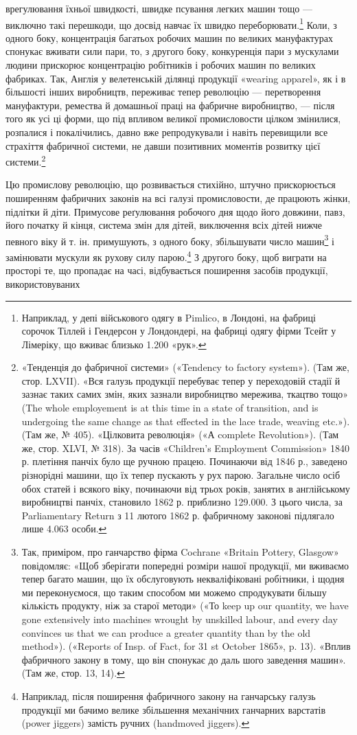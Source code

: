 врегулювання їхньої швидкості, швидке псування легких машин
тощо — виключно такі перешкоди, що досвід навчає їх швидко
переборювати.\footnote{
Наприклад, у депі військового одягу в Pimlico, в Лондоні, на
фабриці сорочок Тіллей і Гендерсон у Лондондері, на фабриці одягу фірми
Тсейт у Лімеріку, що вживає близько 1.200 «рук».
} Коли, з одного боку, концентрація багатьох
робочих машин по великих мануфактурах спонукає вживати сили
пари, то, з другого боку, конкуренція пари з мускулами людини
прискорює концентрацію робітників і робочих машин по великих
фабриках. Так, Англія у велетенській ділянці продукції «wearing
apparel», як і в більшості інших виробництв, переживає тепер
революцію — перетворення мануфактури, ремества й домашньої
праці на фабричне виробництво, — після того як усі ці форми,
що під впливом великої промисловости цілком змінилися,
розпалися і покалічились, давно вже репродукували і навіть
перевищили все страхіття фабричної системи, не давши позитивних
моментів розвитку цієї системи.\footnote{
«Тенденція до фабричної системи» («Tendency to factory system»).
(Там же, стор. LXVII). «Вся галузь продукції перебуває тепер у переходовій
стадії й зазнає таких самих змін, яких зазнали виробництво мережива,
ткацтво тощо» (The whole employement is at this time in a state
of transition, and is undergoing the same change as that effected in the
lace trade, weaving etc.»). (Там же, № 405). «Цілковита революція» («А
complete Revolution»). (Там же, стор. XLVI, № 318). За часів «Children’s
Employment Commission» 1840 р. плетіння панчіх було ще ручною
працею. Починаючи від 1846 р., заведено різнорідні машини, що їх тепер
пускають у рух парою. Загальне число осіб обох статей і всякого
віку, починаючи від трьох років, занятих в англійському виробництві
панчіх, становило 1862 р. приблизно 129.000. З цього числа, за Parliamentary
Return з 11 лютого 1862 р. фабричному законові підлягало
лише 4.063 особи.
}

Цю промислову революцію, що розвивається стихійно, штучно
прискорюється поширенням фабричних законів на всі галузі
промисловости, де працюють жінки, підлітки й діти. Примусове
реґулювання робочого дня щодо його довжини, павз, його початку
й кінця, система змін для дітей, виключення всіх дітей нижче
певного віку й т. ін. примушують, з одного боку, збільшувати
число машин\footnote{
Так, приміром, про ганчарство фірма Cochrane «Britain Pottery,
Glasgow» повідомляє: «Щоб зберігати попередні розміри нашої продукції,
ми вживаємо тепер багато машин, що їх обслуговують некваліфіковані робітники,
і щодня ми переконуємося, що таким способом ми можемо спродукувати
більшу кількість продукту, ніж за старої методи» («То keep up
our quantity, we have gone extensively into machines wrought by unskilled
labour, and every day convinces us that we can produce a greater quantity
than by the old method»). («Reports of Insp. of Fact, for 31 st October
1865», p. 13). «Вплив фабричного закону в тому, що він спонукає до даль
шого заведення машин». (Там же, стор. 13, 14).
} і замінювати мускули як рухову силу парою.\footnote{
Наприклад, після поширення фабричного закону на ганчарську
галузь продукції ми бачимо велике збільшення механічних ганчарних
варстатів (power jiggers) замість ручних (handmoved jiggers).
}
З другого боку, щоб виграти на просторі те, що пропадає на часі,
відбувається поширення засобів продукції, використовуваних